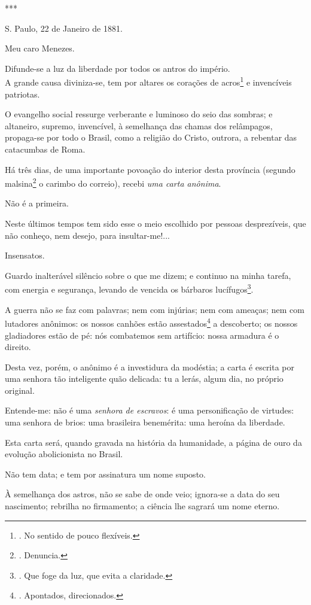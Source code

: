 ***

S. Paulo, 22 de Janeiro de 1881.

Meu caro Menezes.

Difunde-se a luz da liberdade por todos os antros do império.\\
A grande causa diviniza-se, tem por altares os corações de
acros\footnote{. No sentido de pouco flexíveis.} e invencíveis
patriotas.

O evangelho social ressurge verberante e luminoso do seio das sombras; e
altaneiro, supremo, invencível, à semelhança das chamas dos relâmpagos,
propaga-se por todo o Brasil, como a religião do Cristo, outrora, a
rebentar das catacumbas de Roma.

Há três dias, de uma importante povoação do interior desta província
(segundo malsina\footnote{. Denuncia.} o carimbo do correio), recebi
\emph{uma carta anônima}.

Não é a primeira.

Neste últimos tempos tem sido esse o meio escolhido por pessoas
desprezíveis, que não conheço, nem desejo, para insultar-me!...

Insensatos.

Guardo inalterável silêncio sobre o que me dizem; e continuo na minha
tarefa, com energia e segurança, levando de vencida os bárbaros
lucífugos\footnote{. Que foge da luz, que evita a claridade.}.

A guerra não se faz com palavras; nem com injúrias; nem com ameaças; nem
com lutadores anônimos: os nossos canhões estão assestados\footnote{.
  Apontados, direcionados.} a descoberto; os nossos gladiadores estão de
pé: nós combatemos sem artifício: nossa armadura é o direito.

Desta vez, porém, o anônimo é a investidura da modéstia; a carta é
escrita por uma senhora tão inteligente quão delicada: tu a lerás, algum
dia, no próprio original.

Entende-me: não é uma \emph{senhora de escravos}: é uma personificação
de virtudes: uma senhora de brios: uma brasileira benemérita: uma
heroína da liberdade.

Esta carta será, quando gravada na história da humanidade, a página de
ouro da evolução abolicionista no Brasil.

Não tem data; e tem por assinatura um nome suposto.

À semelhança dos astros, não se sabe de onde veio; ignora-se a data do
seu nascimento; rebrilha no firmamento; a ciência lhe sagrará um nome
eterno.

